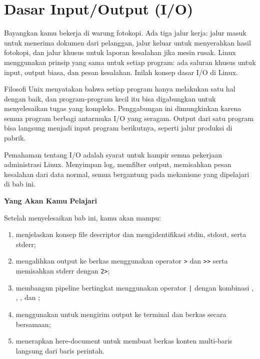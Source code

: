 
\chapter{Dasar Input/Output (I/O)}
\label{ch:basic-io}

Bayangkan kamu bekerja di warung fotokopi. Ada tiga jalur kerja: jalur masuk untuk menerima dokumen dari pelanggan, jalur keluar untuk menyerahkan hasil fotokopi, dan jalur khusus untuk laporan kesalahan jika mesin rusak. Linux menggunakan prinsip yang sama untuk setiap program: ada saluran khusus untuk input, output biasa, dan pesan kesalahan. Inilah konsep dasar I/O di Linux.

Filosofi Unix menyatakan bahwa setiap program hanya melakukan satu hal dengan baik, dan program-program kecil itu bisa digabungkan untuk menyelesaikan tugas yang kompleks. Penggabungan ini dimungkinkan karena semua program berbagi antarmuka I/O yang seragam. Output dari satu program bisa langsung menjadi input program berikutnya, seperti jalur produksi di pabrik.

Pemahaman tentang I/O adalah syarat untuk hampir semua pekerjaan administrasi Linux. Menyimpan log, memfilter output, memisahkan pesan kesalahan dari data normal, semua bergantung pada mekanisme yang dipelajari di bab ini.

\textbf{Yang Akan Kamu Pelajari}

Setelah menyelesaikan bab ini, kamu akan mampu:

\begin{enumerate}
    \item menjelaskan konsep file descriptor dan mengidentifikasi stdin, stdout, serta stderr;
    \item mengalihkan output ke berkas menggunakan operator \texttt{>} dan \texttt{>>} serta memisahkan stderr dengan \texttt{2>};
    \item membangun pipeline bertingkat menggunakan operator \texttt{|} dengan kombinasi , , , dan ;
    \item menggunakan  untuk mengirim output ke terminal dan berkas secara bersamaan;
    \item menerapkan here-document untuk membuat berkas konten multi-baris langsung dari baris perintah.
\end{enumerate}

